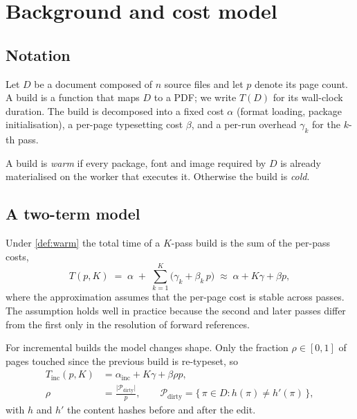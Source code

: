 \chapter{Background and cost model}
\label{chap:background}

\section{Notation}

Let $D$ be a document composed of $n$ source files and let $p$ denote
its page count. A build is a function that maps $D$ to a PDF; we write
$T(D)$ for its wall-clock duration. The build is decomposed into a fixed
cost $\alpha$ (format loading, package initialisation), a per-page
typesetting cost $\beta$, and a per-run overhead $\gamma_k$ for the
$k$-th pass.

\begin{definition}
\label{def:warm}
A build is \emph{warm} if every package, font and image required by $D$
is already materialised on the worker that executes it. Otherwise the
build is \emph{cold}.
\end{definition}

\section{A two-term model}

Under \cref{def:warm} the total time of a $K$-pass build is the sum of
the per-pass costs,
%
\begin{equation}
  \label{eq:model}
  T(p, K) \;=\; \alpha \;+\; \sum_{k=1}^{K}\bigl(\gamma_k + \beta_k\, p\bigr)
  \;\approx\; \alpha + K\gamma + \beta p ,
\end{equation}
%
where the approximation assumes that the per-page cost is stable across
passes. The assumption holds well in practice because the second and
later passes differ from the first only in the resolution of forward
references.

For incremental builds the model changes shape. Only the fraction
$\rho \in [0,1]$ of pages touched since the previous build is
re-typeset, so
%
\begin{align}
  T_{\mathrm{inc}}(p, K) &= \alpha_{\mathrm{inc}} + K\gamma + \beta \rho p ,
  \label{eq:inc} \\[2pt]
  \rho &= \frac{\lvert \mathcal{P}_{\text{dirty}} \rvert}{p} ,
  \qquad
  \mathcal{P}_{\text{dirty}} = \bigl\{\, \pi \in D : h(\pi) \neq h'(\pi) \,\bigr\},
  \label{eq:rho}
\end{align}
%
with $h$ and $h'$ the content hashes before and after the edit.

